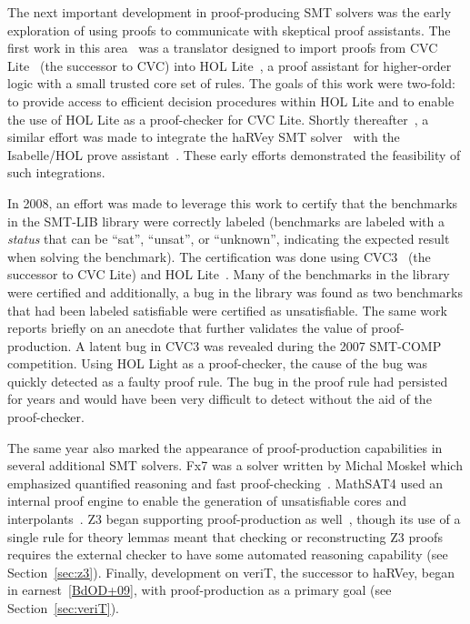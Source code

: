 \documentclass{llncs}
\begin{document}
The next important development in proof-producing SMT solvers was the
early exploration of using proofs to communicate with skeptical proof
assistants.  The first work in this area~\cite{MBG06} was a translator designed
to import proofs from CVC Lite~\cite{BB04} (the successor to CVC) into HOL
Lite~\cite{H96}, a proof assistant for higher-order logic with a small trusted
core set of rules.  The goals of this work were two-fold: to provide access to
efficient decision procedures within HOL Lite and to enable the use of HOL Lite
as a proof-checker for CVC Lite.  Shortly thereafter~\cite{FMM+06,HCF+07}, a similar effort was
made to integrate the haRVey SMT solver~\cite{DR03} with the Isabelle/HOL prove
assistant~\cite{NPW02}. These early efforts demonstrated the feasibility of such
integrations.

In 2008, an effort was made to leverage this work to certify that the
benchmarks in the SMT-LIB library were correctly labeled (benchmarks are
labeled with a \emph{status} that can be ``sat'', ``unsat'', or ``unknown'',
indicating the expected result when solving the benchmark).  The certification
was done using CVC3~\cite{BT07} (the successor to CVC Lite) and
HOL Lite~\cite{GB08}.  Many of the benchmarks in the library were certified and
additionally, a bug in the library was found as two benchmarks that had been
labeled satisfiable were certified as unsatisfiable.
The same work reports briefly on an anecdote that further validates the value
of proof-production.  A latent bug in CVC3 was revealed during the 2007
SMT-COMP competition.  Using HOL Light as a proof-checker, the cause of the bug
was quickly detected as a faulty proof rule.  The bug in the proof rule had
persisted for years and would have been very difficult to detect without the
aid of the proof-checker.

The same year also marked the appearance of proof-production capabilities in
several additional SMT solvers.  Fx7 was a solver written by Michal Moske\l
which emphasized quantified reasoning and fast proof-checking~\cite{M08}.
MathSAT4 used an internal proof engine to enable the generation of
unsatisfiable cores and interpolants~\cite{BCF+08}.  Z3 began supporting
proof-production as well~\cite{dMB08}, though its use of a single rule for
theory lemmas meant that checking or reconstructing Z3 proofs requires the
external checker to have some automated reasoning capability (see
Section~\ref{sec:z3}).  Finally, development on veriT, the successor to haRVey,
began in earnest~\ref{BdOD+09}, with proof-production as a primary goal (see Section~\ref{sec:veriT}).
\end{document}

